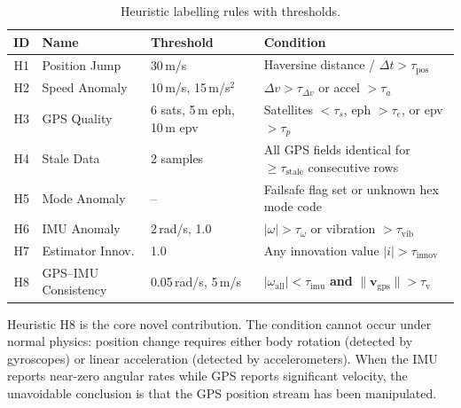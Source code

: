 \begin{table}[H]
\centering
\caption{Heuristic labelling rules with thresholds.}
\label{tab:heuristics}
\small
\begin{tabular}{@{}cllp{5cm}@{}}
\toprule
\textbf{ID} & \textbf{Name} & \textbf{Threshold} & \textbf{Condition} \\
\midrule
H1 & Position Jump       & 30\,m/s   & Haversine distance / $\Delta t > \tau_{\text{pos}}$ \\
H2 & Speed Anomaly       & 10\,m/s, 15\,m/s$^2$ & $\Delta v > \tau_{\Delta v}$ or accel $> \tau_a$ \\
H3 & GPS Quality         & 6 sats, 5\,m eph, 10\,m epv & Satellites $< \tau_s$, eph $> \tau_e$, or epv $> \tau_p$ \\
H4 & Stale Data          & 2 samples  & All GPS fields identical for $\geq \tau_{\text{stale}}$ consecutive rows \\
H5 & Mode Anomaly        & --         & Failsafe flag set or unknown hex mode code \\
H6 & IMU Anomaly         & 2\,rad/s, 1.0 & $|\omega| > \tau_{\omega}$ or vibration $> \tau_{\text{vib}}$ \\
H7 & Estimator Innov.    & 1.0        & Any innovation value $|i| > \tau_{\text{innov}}$ \\
H8 & GPS--IMU Consistency & 0.05\,rad/s, 5\,m/s & $|\omega_{\text{all}}| < \tau_{\text{imu}}$ \textbf{and} $\|\mathbf{v}_{\text{gps}}\| > \tau_{\text{v}}$ \\
\bottomrule
\end{tabular}
\end{table}

Heuristic H8 is the core novel contribution. The condition cannot occur under normal physics: position change requires either body rotation (detected by gyroscopes) or linear acceleration (detected by accelerometers). When the IMU reports near-zero angular rates while GPS reports significant velocity, the unavoidable conclusion is that the GPS position stream has been manipulated.

